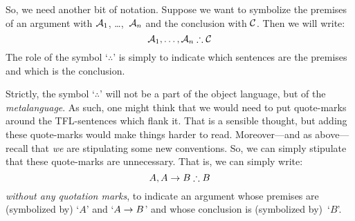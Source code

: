 

So, we need another bit of notation. Suppose we want to symbolize the premises of an argument with $\mathcal{A}_1$, \dots,~$\mathcal{A}_n$ and the conclusion with $\mathcal{C}$. Then we will write:
$$\metav{A}_1, \ldots, \metav{A}_n \therefore \metav{C}$$
The role of the symbol `$\therefore$' is simply to indicate which sentences are the premises and which is the conclusion.


Strictly, the symbol `$\therefore$' will not be a part of the object language, but of the \emph{metalanguage}. As such, one might think that we would need to put quote-marks around the TFL-sentences which flank it. That is a sensible thought, but adding these quote-marks would make things harder to read. Moreover---and as above---recall that \emph{we} are stipulating some new conventions. So, we can simply stipulate that these quote-marks are unnecessary. That is, we can simply write:
$$A, A \eif B \therefore B$$
\emph{without any quotation marks}, to indicate an argument whose premises are (symbolized by) `$A$' and `$A \rightarrow B$' and whose conclusion is (symbolized by)~`$B$'.
